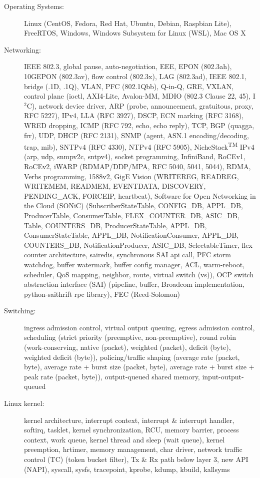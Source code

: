 \documentclass[letterpaper,11pt]{article}
\begin{document}
\begin{description}
\item[Operating Systems:] Linux (CentOS, Fedora, Red Hat, Ubuntu, Debian, Raspbian Lite), FreeRTOS, Windows, Windows Subsystem for Linux (WSL), Mac OS X

\item[Networking:] IEEE 802.3, global pause, auto-negotiation, EEE, EPON (802.3ah), 10GEPON (802.3av), flow control (802.3x), LAG (802.3ad),
IEEE 802.1, bridge (.1D, .1Q), VLAN, PFC (802.1Qbb), Q-in-Q, GRE, VXLAN,
control plane (ioctl, AXI4-Lite, Avalon-MM, MDIO (802.3 Clause 22, 45), I$^2$C),
network device driver, ARP (probe, announcement, gratuitous, proxy, RFC 5227), IPv4, LLA (RFC 3927), DSCP, ECN marking (RFC 3168), WRED dropping,
ICMP (RFC 792, echo, echo reply),
TCP, BGP (quagga, frr), UDP, DHCP (RFC 2131), SNMP (agent, ASN.1 encoding/decoding, trap, mib), SNTPv4 (RFC 4330), NTPv4 (RFC 5905),
NicheStack\textsuperscript{TM} IPv4 (arp, udp, snmpv2c, sntpv4), socket programming,
%
InfiniBand, RoCEv1, RoCEv2,
iWARP (RDMAP/DDP/MPA, RFC 5040, 5041, 5044), RDMA, Verbs programming,
%
1588v2,
GigE Vision (WRITEREG, READREG, WRITEMEM, READMEM, EVENTDATA, DISCOVERY, PENDING\_ACK, FORCEIP, heartbeat),
%
Software for Open Networking in the Cloud (SONiC) (SubscriberStateTable, CONFIG\_DB, APPL\_DB,
ProducerTable, ConsumerTable, FLEX\_COUNTER\_DB, ASIC\_DB,
Table, COUNTERS\_DB,
ProducerStateTable, APPL\_DB, ConsumerStateTable, APPL\_DB,
%
NotificationConsumer, APPL\_DB, COUNTERS\_DB, NotificationProducer, ASIC\_DB,
SelectableTimer,
flex counter architecture, sairedis, synchronous SAI api call, PFC storm watchdog,
buffer watermark, buffer config manager, ACL, warm-reboot, scheduler, QoS mapping, neighbor, route, virtual switch (vs)),
%
OCP switch abstraction interface (SAI) (pipeline, buffer, Broadcom implementation, python-saithrift rpc library),
FEC (Reed-Solomon)

\item[Switching:] ingress admission control, virtual output queuing, egress admission control,
scheduling (strict priority (preemptive, non-preemptive),
round robin (work-conserving, native (packet), weighted (packet), deficit (byte), weighted deficit (byte)),
policing/traffic shaping (average rate (packet, byte), average rate + burst size (packet, byte), average rate + burst size + peak rate (packet, byte)),
output-queued shared memory, input-output-queued

\item[Linux kernel:] kernel architecture, interrupt context, interrupt \& interrupt handler, softirq, tasklet, kernel synchronization,
RCU, memory barrier, process context, work queue, kernel thread and sleep (wait queue), kernel preemption, hrtimer, memory management,
char driver, network traffic control (TC) (token bucket filter), Tx \& Rx path below layer 3, new API (NAPI),
syscall, sysfs, tracepoint, kprobe, kdump, kbuild, kallsyms


\end{description}
\end{document}
